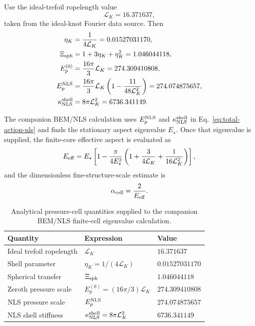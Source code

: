 \documentclass[11pt]{article}
\newcommand{\EpNLS}{E_p^{\rm NLS}}
\newcommand{\kappaNLS}{\kappa_{\rm NLS}^{\rm shell}}
\begin{document}
Use the ideal-trefoil ropelength value
\begin{equation}
  \mathcal L_K = 16.371637,
\end{equation}
taken from the ideal-knot Fourier data source.  Then
\begin{align}
  \eta_K &= \frac{1}{4\mathcal L_K}=0.01527031170,\\
  \Xi_{\rm sph} &= 1+3\eta_K+\eta_K^2=1.046044118,\\
  E_p^{(0)} &= \frac{16\pi}{3}\mathcal L_K=274.309410808,\\
  \EpNLS
  &=
  \frac{16\pi}{3}\mathcal L_K
  \left(1-\frac{11}{48\mathcal L_K^2}\right)
  =
  274.074875657,\\
  \kappaNLS &= 8\pi\mathcal L_K^2=6736.341149.
\end{align}

The companion BEM/NLS calculation uses \(\EpNLS\) and \(\kappaNLS\) in
Eq.~\eqref{eq:total-action-nls} and finds the stationary aspect eigenvalue \(E_\star\).  Once
that eigenvalue is supplied, the finite-core effective aspect is evaluated as
\begin{equation}
  E_{\rm eff}
  =
  E_\star
  \left[
  1-
  \frac{\pi}{4E_\star^2}
  \left(
  1+\frac{3}{4\mathcal L_K}+\frac{1}{16\mathcal L_K^2}
  \right)
  \right],
  \label{eq:Eeff-star}
\end{equation}
and the dimensionless fine-structure-scale estimate is
\begin{equation}
  \alpha_{\rm cell}=\frac{2}{E_{\rm eff}}.
  \label{eq:alpha-star}
\end{equation}

\begin{table}[h]
\centering
\caption{Analytical pressure-cell quantities supplied to the companion BEM/NLS finite-cell eigenvalue calculation.}
\begin{tabular}{@{}lll@{}}
\toprule
Quantity & Expression & Value \\
\midrule
Ideal trefoil ropelength & \(\mathcal L_K\) & \(16.371637\) \\
Shell parameter & \(\eta_K=1/(4\mathcal L_K)\) & \(0.01527031170\) \\
Spherical transfer & \(\Xi_{\rm sph}\) & \(1.046044118\) \\
Zeroth pressure scale & \(E_p^{(0)}=(16\pi/3)\mathcal L_K\) & \(274.309410808\) \\
NLS pressure scale & \(\EpNLS\) & \(274.074875657\) \\
NLS shell stiffness & \(\kappaNLS=8\pi\mathcal L_K^2\) & \(6736.341149\) \\
\bottomrule
\end{tabular}
\label{tab:nls-pressure}
\end{table}
\end{document}
